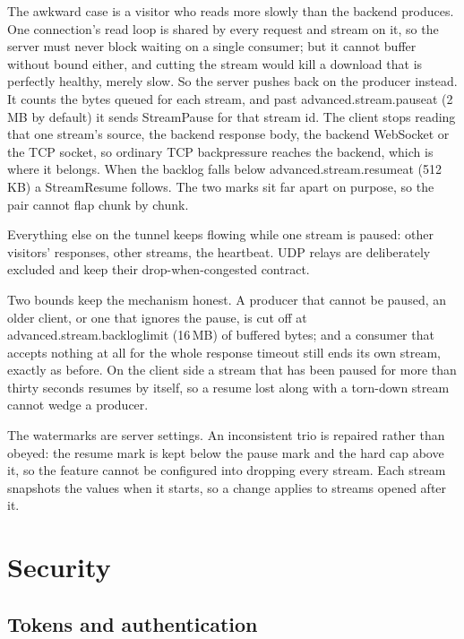 \documentclass[11pt,a4paper,oneside]{book}
\newcommand{\aperiobreakableunderscore}{\textunderscore\allowbreak}
\newcommand{\aperiocodebreaks}{\XeTeXinterchartokenstate=1 }
\newcommand{\aperiocodebreaks}{}
\DeclareRobustCommand{\code}[1]{{\ttfamily\small\aperiocodebreaks
  \let\_\aperiobreakableunderscore#1}}
\begin{document}
The awkward case is a visitor who reads more slowly than the backend
produces. One connection's read loop is shared by every request and stream
on it, so the server must never block waiting on a single consumer; but it
cannot buffer without bound either, and cutting the stream would kill a
download that is perfectly healthy, merely slow. So the server pushes back
on the producer instead. It counts the bytes queued for each stream, and
past \code{advanced.stream.pause\_at} (2\,MB by default) it sends
\code{StreamPause} for that stream id. The client stops reading that one
stream's source, the backend response body, the backend WebSocket or the
TCP socket, so ordinary TCP backpressure reaches the backend, which is
where it belongs. When the backlog falls below
\code{advanced.stream.resume\_at} (512\,KB) a \code{StreamResume}
follows. The two marks sit far apart on purpose, so the pair cannot flap
chunk by chunk.

Everything else on the tunnel keeps flowing while one stream is paused:
other visitors' responses, other streams, the heartbeat. UDP relays are
deliberately excluded and keep their drop-when-congested contract.

Two bounds keep the mechanism honest. A producer that cannot be paused,
an older client, or one that ignores the pause, is cut off at
\code{advanced.stream.backlog\_limit} (16\,MB) of buffered bytes; and a
consumer that accepts nothing at all for the whole response timeout still
ends its own stream, exactly as before. On the client side a stream that
has been paused for more than thirty seconds resumes by itself, so a
resume lost along with a torn-down stream cannot wedge a producer.

The watermarks are server settings. An inconsistent trio is repaired
rather than obeyed: the resume mark is kept below the pause mark and the
hard cap above it, so the feature cannot be configured into dropping every
stream. Each stream snapshots the values when it starts, so a change
applies to streams opened after it.

\part{Security}

\chapter{Tokens and authentication}
\label{ch:tokens}
\end{document}
